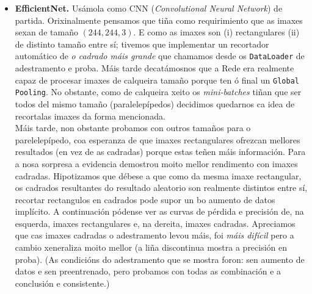 \documentclass{article}
\begin{document}
\begin{itemize}
	\item  \textbf{EfficientNet.} \cite{tan2019efficientnet} Usámola como CNN (\emph{Convolutional Neural Network}) de partida. Orixinalmente pensamos que tiña como requirimiento que as imaxes sexan de tamaño $(244,244,3)$. E como as imaxes son (i) rectangulares (ii) de distinto tamaño entre sí; tivemos que implementar un recortador automático de \emph{o cadrado máis grande} que chamamos desde os \texttt{DataLoader} de adestramento e proba. Máis tarde decatámosnos que a Rede era realmente capaz de procesar imaxes de calqueira tamaño porque ten ó final un \texttt{Global Pooling}. No obstante, como de calqueira xeito os \emph{mini-batches} tiñan que ser todos del mismo tamaño (paralelepípedos) decidimos quedarnos ca idea de recortalas imaxes da forma mencionada. \\

Máis tarde, non obstante probamos con outros tamaños para o parelelepípedo, coa esperanza de que imaxes rectangulares ofrezcan mellores resultados (en vez de as cadradas) porque estas teñen máis información. Para a nosa sorpresa a evidencia demostrou moito mellor rendimento con imaxes cadradas. Hipotizamos que débese a que como da mesma imaxe rectangular, os cadrados resultantes do resultado aleatorio son realmente distintos entre sí, recortar rectangulos en cadrados pode supor un bo aumento de datos implícito. A continuación pódense ver as curvas de pérdida e precisión de, na esquerda, imaxes rectangulares e, na dereita, imaxes cadradas. Apreciamos que cas imaxes cadradas o adestramento levou máis, foi \emph{máis difícil} pero a cambio xeneraliza moito mellor (a liña discontinua mostra a precisión en proba). (As condicións do adestramento que se mostra foron: sen aumento de datos e sen preentrenado, pero probamos con todas as combinación e a conclusión e consistente.)\\




\end{itemize}
\end{document}
